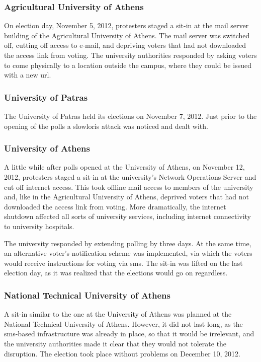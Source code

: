 \documentclass[jets]{usenixjournal}
\begin{document}
\subsubsection{Agricultural University of Athens}

On election day, November 5, 2012, protesters staged a sit-in at the
mail server building of the Agricultural University of Athens. The
mail server was switched off, cutting off access to e-mail, and
depriving voters that had not downloaded the access link from voting.
The university authorities responded by asking voters to come
physically to a location outside the campus, where they could be
issued with a new {\sc url}.

\subsubsection{University of Patras}

The University of Patras held its elections on November 7, 2012. Just
prior to the opening of the polls a slowloris attack was noticed and
dealt with.

\subsubsection{University of Athens}

A little while after polls opened at the University of Athens, on
November 12, 2012, protesters staged a sit-in at the university's
Network Operations Server and cut off internet access. This took
offline mail access to members of the university and, like in the
Agricultural University of Athens, deprived voters that had not
downloaded the access link from voting. More dramatically, the
internet shutdown affected all sorts of university services, including
internet connectivity to university hospitals.

The university responded by extending polling by three days. At the
same time, an alternative voter's notification scheme was implemented,
via which the voters would receive instructions for voting via {\sc sms}.
The sit-in was lifted on the last election day, as it was realized
that the elections would go on regardless.

\subsubsection{National Technical University of Athens}

A sit-in similar to the one at the University of Athens was planned at
the National Technical University of Athens. However, it did not last
long, as the {\sc sms}-based infrastructure was already in place, so
that it would be irrelevant, and the university authorities made it
clear that they would not tolerate the disruption. The election took
place without problems on December 10, 2012.
\end{document}
